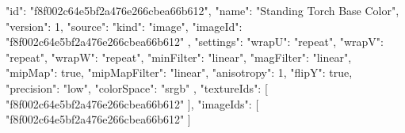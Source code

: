 {
  "id": "f8f002c64e5bf2a476e266cbea66b612",
  "name": "Standing Torch Base Color",
  "version": 1,
  "source": {
    "kind": "image",
    "imageId": "f8f002c64e5bf2a476e266cbea66b612"
  },
  "settings": {
    "wrapU": "repeat",
    "wrapV": "repeat",
    "wrapW": "repeat",
    "minFilter": "linear",
    "magFilter": "linear",
    "mipMap": true,
    "mipMapFilter": "linear",
    "anisotropy": 1,
    "flipY": true,
    "precision": "low",
    "colorSpace": "srgb"
  },
  "textureIds": [
    "f8f002c64e5bf2a476e266cbea66b612"
  ],
  "imageIds": [
    "f8f002c64e5bf2a476e266cbea66b612"
  ]
}

